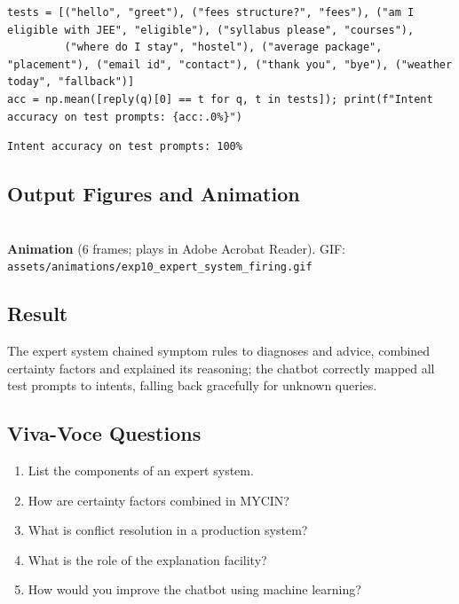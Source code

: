 \documentclass[11pt]{article}
\begin{document}
\begin{lstlisting}[style=py]
tests = [("hello", "greet"), ("fees structure?", "fees"), ("am I eligible with JEE", "eligible"), ("syllabus please", "courses"),
         ("where do I stay", "hostel"), ("average package", "placement"), ("email id", "contact"), ("thank you", "bye"), ("weather today", "fallback")]
acc = np.mean([reply(q)[0] == t for q, t in tests]); print(f"Intent accuracy on test prompts: {acc:.0%}")
\end{lstlisting}
\begin{lstlisting}[style=out]
Intent accuracy on test prompts: 100%
\end{lstlisting}
\subsection*{Output Figures and Animation}
\begin{center}
\\
{\small\color{slate}\textbf{Animation} (6 frames; plays in Adobe Acrobat Reader). GIF: \texttt{assets/animations/exp10\_expert\_system\_firing.gif}}
\end{center}
\subsection*{Result}
\begin{outcome}The expert system chained symptom rules to diagnoses and advice, combined certainty factors and explained its reasoning; the chatbot correctly mapped all test prompts to intents, falling back gracefully for unknown queries.\end{outcome}
\subsection*{Viva-Voce Questions}
\begin{enumerate}
\item List the components of an expert system.
\item How are certainty factors combined in MYCIN?
\item What is conflict resolution in a production system?
\item What is the role of the explanation facility?
\item How would you improve the chatbot using machine learning?
\end{enumerate}
\end{document}

